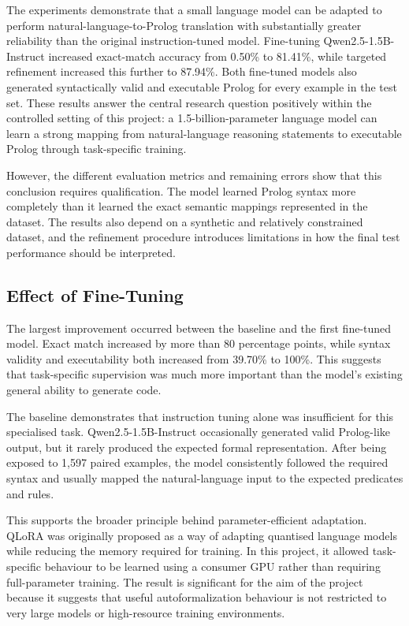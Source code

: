 \documentclass[11pt]{article} %
\theoremstyle{plain}
\theoremstyle{definition}
\begin{document}
The experiments demonstrate that a small language model can be adapted to
perform natural-language-to-Prolog translation with substantially greater
reliability than the original instruction-tuned model. Fine-tuning
Qwen2.5-1.5B-Instruct increased exact-match accuracy from 0.50\% to 81.41\%,
while targeted refinement increased this further to 87.94\%. Both fine-tuned
models also generated syntactically valid and executable Prolog for every
example in the test set. These results answer the central research question
positively within the controlled setting of this project: a
1.5-billion-parameter language model can learn a strong mapping from
natural-language reasoning statements to executable Prolog through
task-specific training.

However, the different evaluation metrics and remaining errors show that this
conclusion requires qualification. The model learned Prolog syntax more
completely than it learned the exact semantic mappings represented in the
dataset. The results also depend on a synthetic and relatively constrained
dataset, and the refinement procedure introduces limitations in how the final
test performance should be interpreted.


\subsection{Effect of Fine-Tuning}

The largest improvement occurred between the baseline and the first fine-tuned
model. Exact match increased by more than 80 percentage points, while syntax
validity and executability both increased from 39.70\% to 100\%. This suggests
that task-specific supervision was much more important than the model's
existing general ability to generate code.

The baseline demonstrates that instruction tuning alone was insufficient for
this specialised task. Qwen2.5-1.5B-Instruct occasionally generated valid
Prolog-like output, but it rarely produced the expected formal representation.
After being exposed to 1,597 paired examples, the model consistently followed
the required syntax and usually mapped the natural-language input to the
expected predicates and rules.

This supports the broader principle behind parameter-efficient adaptation.
QLoRA was originally proposed as a way of adapting quantised language models
while reducing the memory required for training. In this project, it allowed
task-specific behaviour to be learned using a consumer GPU rather than
requiring full-parameter training. The result is significant for the aim of
the project because it suggests that useful autoformalization behaviour is not
restricted to very large models or high-resource training environments.
\end{document}
